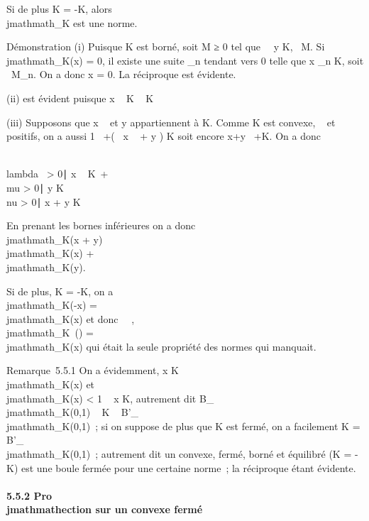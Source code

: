 \documentclass[]{article}
\begin{document}
Si de plus K = -K, alors \\jmathmath_K est une norme.

Démonstration (i) Puisque K est borné, soit M ≥ 0 tel que
\forall~~y \in K,
\y\ \leq M. Si
\\jmathmath_K(x) = 0, il existe une suite \lambda_n tendant vers 0
telle que  x \over \lambda_n \in K, soit
\x\ \leq M\lambda_n.
On a donc x = 0. La réciproque est évidente.

(ii) est évident puisque  x \over \lambda~ \in K
\Leftrightarrow \mux \over \mu\lambda~ \in K

(iii) Supposons que  x \over \lambda~ et  y
\over \mu appartiennent à K. Comme K est convexe, \lambda~ et \mu
positifs, on a aussi  1 \over \lambda~+\mu (\lambda~ x
\over \lambda~ + \mu y \over \mu ) \in K soit
encore  x+y \over \lambda~+\mu \in K. On a donc

\\lambda~ \textgreater{} 0∣ x
\over \lambda~ \in K\ + \\mu
\textgreater{} 0∣ y \over
\mu \in K\ \subset~\\nu \textgreater{}
0∣ x + y \over \nu \in
K\

En prenant les bornes inférieures on a donc \\jmathmath_K(x + y) \leq
\\jmathmath_K(x) + \\jmathmath_K(y).

Si de plus, K = -K, on a \\jmathmath_K(-x) = \\jmathmath_K(x) et donc
\forall~\mu \in {}~, \\jmathmath_K~(\mux) =
\mu\\jmathmath_K(x) qui était la seule propriété des
normes qui manquait.

Remarque~5.5.1 On a évidemment, x \in K \rigtharrow~ \\jmathmath_K(x)  et
\\jmathmath_K(x) \textless{} 1 \rigtharrow~ x \in K, autrement dit
B_\\jmathmath_K(0,1) \subset~ K \subset~ B'_\\jmathmath_K(0,1)~; si on
suppose de plus que K est fermé, on a facilement K =
B'_\\jmathmath_K(0,1)~; autrement dit un convexe, fermé, borné
et équilibré (K = -K) est une boule fermée pour une certaine norme~; la
réciproque étant évidente.

\paragraph{5.5.2 Pro\\jmathmathection sur un convexe fermé}
\end{document}
